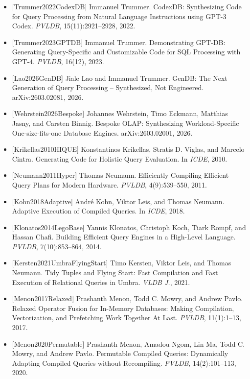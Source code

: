 \documentclass[
]{article}
\providecommand{\tightlist}{%
  \setlength{\itemsep}{0pt}\setlength{\parskip}{0pt}}
\begin{document}
\begin{itemize}
\tightlist
\item
  {[}Trummer2022CodexDB{]} Immanuel Trummer. CodexDB: Synthesizing Code
  for Query Processing from Natural Language Instructions using GPT-3
  Codex. \emph{PVLDB}, 15(11):2921--2928, 2022.
\item
  {[}Trummer2023GPTDB{]} Immanuel Trummer. Demonstrating GPT-DB:
  Generating Query-Specific and Customizable Code for SQL Processing
  with GPT-4. \emph{PVLDB}, 16(12), 2023.
\item
  {[}Lao2026GenDB{]} Jiale Lao and Immanuel Trummer. GenDB: The Next
  Generation of Query Processing -- Synthesized, Not Engineered.
  arXiv:2603.02081, 2026.
\item
  {[}Wehrstein2026Bespoke{]} Johannes Wehrstein, Timo Eckmann, Matthias
  Jasny, and Carsten Binnig. Bespoke OLAP: Synthesizing
  Workload-Specific One-size-fits-one Database Engines.
  arXiv:2603.02001, 2026.
\item
  {[}Krikellas2010HIQUE{]} Konstantinos Krikellas, Stratis D. Viglas,
  and Marcelo Cintra. Generating Code for Holistic Query Evaluation. In
  \emph{ICDE}, 2010.
\item
  {[}Neumann2011Hyper{]} Thomas Neumann. Efficiently Compiling Efficient
  Query Plans for Modern Hardware. \emph{PVLDB}, 4(9):539--550, 2011.
\item
  {[}Kohn2018Adaptive{]} André Kohn, Viktor Leis, and Thomas Neumann.
  Adaptive Execution of Compiled Queries. In \emph{ICDE}, 2018.
\item
  {[}Klonatos2014LegoBase{]} Yannis Klonatos, Christoph Koch, Tiark
  Rompf, and Hassan Chafi. Building Efficient Query Engines in a
  High-Level Language. \emph{PVLDB}, 7(10):853--864, 2014.
\item
  {[}Kersten2021UmbraFlyingStart{]} Timo Kersten, Viktor Leis, and
  Thomas Neumann. Tidy Tuples and Flying Start: Fast Compilation and
  Fast Execution of Relational Queries in Umbra. \emph{VLDB J.}, 2021.
\item
  {[}Menon2017Relaxed{]} Prashanth Menon, Todd C. Mowry, and Andrew
  Pavlo. Relaxed Operator Fusion for In-Memory Databases: Making
  Compilation, Vectorization, and Prefetching Work Together At Last.
  \emph{PVLDB}, 11(1):1--13, 2017.
\item
  {[}Menon2020Permutable{]} Prashanth Menon, Amadou Ngom, Lin Ma, Todd
  C. Mowry, and Andrew Pavlo. Permutable Compiled Queries: Dynamically
  Adapting Compiled Queries without Recompiling. \emph{PVLDB},
  14(2):101--113, 2020.

\end{itemize}
\end{document}
